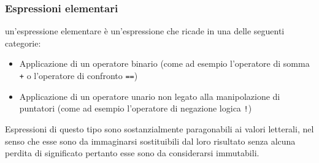 \subsubsection{Espressioni elementari}
un'espressione elementare è un'espressione che ricade in una delle seguenti categorie:
\begin{itemize}
    \item Applicazione di un operatore binario (come ad esempio l'operatore di somma \texttt{+} o l'operatore di confronto \texttt{==})
    \item Applicazione di un operatore unario non legato alla manipolazione di puntatori (come ad esempio l'operatore di negazione logica \texttt{!})
\end{itemize}
Espressioni di questo tipo sono sostanzialmente paragonabili ai valori letterali, nel senso che 
esse sono da immaginarsi sostituibili dal loro risultato senza alcuna perdita di significato pertanto 
esse sono da considerarsi immutabili.